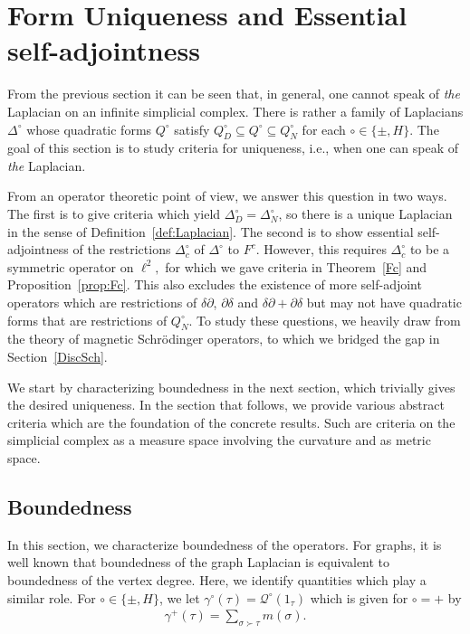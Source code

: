 \documentclass[10pt]{amsart}
\theoremstyle{definition}
\newcommand{\F}{{F}}
\renewcommand{\bullet}{{\circ}}
\newcommand{\Q}{\mathcal{Q}}
\begin{document}
\section{Form Uniqueness and Essential self-adjointness}\label{FormeqEssSa}


From the previous section it can be seen that, in general, one cannot speak of \emph{the} Laplacian on an infinite simplicial complex. There is rather a family of Laplacians $\Delta^{\bullet}$ whose quadratic forms $Q^{ \bullet}$ satisfy $Q_{D}^{\bullet}\subseteq Q^{\bullet}\subseteq Q_{N}^{\bullet}$ for each $\bullet\in\{\pm,H\}$. The goal of this section is to study criteria for uniqueness, i.e., when one can speak of \emph{the} Laplacian.


From an operator theoretic point of view, we answer this question in two ways. The first is to give criteria which yield $\Delta_{D}^{\bullet}=\Delta_{N}^{\bullet}$, so there is a unique Laplacian in the sense of Definition~\ref{def:Laplacian}. 
The second is to show essential self-adjointness of the restrictions $\Delta^\bullet_{c}$ of $\Delta^\bullet$ to $\F^c$. However, this requires $\Delta^\bullet_{c}$ to be a symmetric operator on $\ell^{2},$ for which we gave criteria in Theorem~\ref{Fc} and Proposition~\ref{prop:Fc}. This also excludes the existence of more self-adjoint operators which are restrictions of $\delta\partial$, $\partial\delta$ and $\delta\partial+\partial\delta$ but may not have quadratic forms that are restrictions of $Q^{\bullet}_{N}$. To study these questions, we heavily draw from the theory of magnetic Schrödinger operators, to which we bridged the gap in Section~\ref{DiscSch}.

We start by characterizing boundedness in the next section, which trivially gives the desired uniqueness. In the section that follows, we provide various abstract criteria which are the foundation of the concrete results. Such are criteria on the simplicial complex as a measure space involving the curvature and as metric space.


\subsection{Boundedness}\label{boundedness}
In this section, we characterize boundedness of the operators. For graphs, it is well known that boundedness of the graph Laplacian is equivalent to boundedness of the vertex degree. Here, we identify quantities which play a similar role. For $\bullet\in\{\pm,H\}$, we let $\gamma^{\bullet}(\tau)=\Q^{\bullet}(1_{\tau})$ which is given for $\bullet=+$ by
\begin{align*}
	\gamma^+(\tau) = \sum_{\sigma\succ \tau}m(\sigma).
\end{align*}
\end{document}
